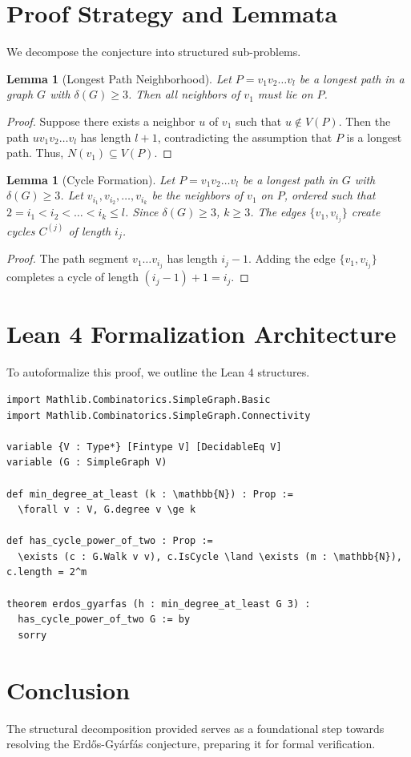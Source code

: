 \documentclass[11pt,a4paper]{article}
\newtheorem{lemma}[theorem]{Lemma}
\begin{document}
\section{Proof Strategy and Lemmata}

We decompose the conjecture into structured sub-problems.

\begin{lemma}[Longest Path Neighborhood]
\label{lem:longest_path}
Let $P = v_1 v_2 \dots v_l$ be a longest path in a graph $G$ with $\delta(G) \ge 3$. Then all neighbors of $v_1$ must lie on $P$.
\end{lemma}

\begin{proof}
Suppose there exists a neighbor $u$ of $v_1$ such that $u \notin V(P)$. Then the path $u v_1 v_2 \dots v_l$ has length $l+1$, contradicting the assumption that $P$ is a longest path. Thus, $N(v_1) \subseteq V(P)$.
\end{proof}

\begin{lemma}[Cycle Formation]
\label{lem:cycle_lengths}
Let $P = v_1 v_2 \dots v_l$ be a longest path in $G$ with $\delta(G) \ge 3$. Let $v_{i_1}, v_{i_2}, \dots, v_{i_k}$ be the neighbors of $v_1$ on $P$, ordered such that $2 = i_1 < i_2 < \dots < i_k \le l$. Since $\delta(G) \ge 3$, $k \ge 3$. The edges $\{v_1, v_{i_j}\}$ create cycles $C^{(j)}$ of length $i_j$.
\end{lemma}

\begin{proof}
The path segment $v_1 \dots v_{i_j}$ has length $i_j - 1$. Adding the edge $\{v_1, v_{i_j}\}$ completes a cycle of length $(i_j - 1) + 1 = i_j$.
\end{proof}

\section{Lean 4 Formalization Architecture}
To autoformalize this proof, we outline the Lean 4 structures.

\begin{verbatim}
import Mathlib.Combinatorics.SimpleGraph.Basic
import Mathlib.Combinatorics.SimpleGraph.Connectivity

variable {V : Type*} [Fintype V] [DecidableEq V]
variable (G : SimpleGraph V)

def min_degree_at_least (k : \mathbb{N}) : Prop :=
  \forall v : V, G.degree v \ge k

def has_cycle_power_of_two : Prop :=
  \exists (c : G.Walk v v), c.IsCycle \land \exists (m : \mathbb{N}), c.length = 2^m

theorem erdos_gyarfas (h : min_degree_at_least G 3) :
  has_cycle_power_of_two G := by
  sorry
\end{verbatim}

\section{Conclusion}
The structural decomposition provided serves as a foundational step towards resolving the Erd\H{o}s-Gy\'{a}rf\'{a}s conjecture, preparing it for formal verification.
\end{document}
